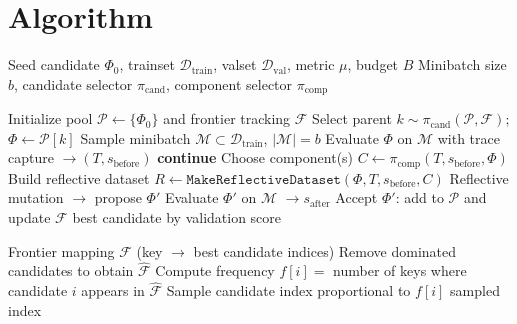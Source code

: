\section{Algorithm}
\begin{algorithm}[H]
\caption{GEPA (Baseline): Reflective Evolutionary Prompt Optimizer}
\label{alg:gepa_baseline}
\begin{algorithmic}[1]
\Require Seed candidate $\Phi_0$, trainset $\mathcal{D}_{\text{train}}$, valset $\mathcal{D}_{\text{val}}$, metric $\mu$, budget $B$
\Require Minibatch size $b$, candidate selector $\pi_{\text{cand}}$, component selector $\pi_{\text{comp}}$

\State Initialize pool $\mathcal{P}\leftarrow\{\Phi_0\}$ and frontier tracking $\mathcal{F}$
    \State Select parent $k \sim \pi_{\text{cand}}(\mathcal{P},\mathcal{F})$; $\Phi\leftarrow \mathcal{P}[k]$
    \State Sample minibatch $\mathcal{M}\subset\mathcal{D}_{\text{train}}$, $|\mathcal{M}|=b$
    \State Evaluate $\Phi$ on $\mathcal{M}$ with trace capture $\rightarrow (T, s_{\text{before}})$
     \State \textbf{continue} \EndIf
    \State Choose component(s) $C \leftarrow \pi_{\text{comp}}(T, s_{\text{before}}, \Phi)$
    \State Build reflective dataset $R \leftarrow \texttt{MakeReflectiveDataset}(\Phi, T, s_{\text{before}}, C)$
    \State Reflective mutation $\rightarrow$ propose $\Phi'$
    \State Evaluate $\Phi'$ on $\mathcal{M}$ $\rightarrow s_{\text{after}}$
        \State Accept $\Phi'$: add to $\mathcal{P}$ and update $\mathcal{F}$
    \EndIf
\EndWhile
\State \Return best candidate by validation score
\end{algorithmic}
\end{algorithm}

\begin{algorithm}[H]
\caption{Pareto-Based Candidate Selection}
\label{alg:pareto_selection}
\begin{algorithmic}[1]
\Require Frontier mapping $\mathcal{F}$ (key $\rightarrow$ best candidate indices)
\State Remove dominated candidates to obtain $\hat{\mathcal{F}}$
\State Compute frequency $f[i] =$ number of keys where candidate $i$ appears in $\hat{\mathcal{F}}$
\State Sample candidate index proportional to $f[i]$
\State \Return sampled index
\end{algorithmic}
\end{algorithm}

